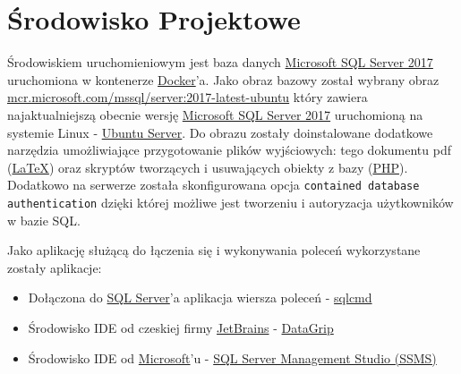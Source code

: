 \section{Środowisko Projektowe}

Środowiskiem uruchomieniowym jest baza danych \href{https://www.microsoft.com/pl-pl/sql-server/sql-server-2017}{Microsoft SQL Server 2017} uruchomiona w kontenerze \href{https://www.docker.com}{Docker}'a. Jako obraz bazowy został wybrany obraz \href{https://hub.docker.com/r/microsoft/mssql-server}{mcr.microsoft.com/mssql/server:2017-latest-ubuntu} który zawiera najaktualniejszą obecnie wersję \href{https://www.microsoft.com/pl-pl/sql-server/sql-server-2017}{Microsoft SQL Server 2017} uruchomioną na systemie Linux - \href{https://www.ubuntu.com/server}{Ubuntu Server}. Do obrazu zostały doinstalowane dodatkowe narzędzia umożliwiające przygotowanie plików wyjściowych: tego dokumentu pdf (\href{https://pl.wikipedia.org/wiki/LaTeX}{\LaTeX}) oraz skryptów tworzących i usuwających obiekty z bazy (\href{http://www.php.net}{PHP}). Dodatkowo na serwerze została skonfigurowana opcja \texttt{contained database authentication} dzięki której możliwe jest tworzeniu i autoryzacja użytkowników w bazie SQL.

Jako aplikację służącą do łączenia się i wykonywania poleceń wykorzystane zostały aplikacje: 

\begin{itemize}
\item Dołączona do \href{https://www.microsoft.com/pl-pl/sql-server/sql-server-2017}{SQL Server}'a aplikacja wiersza poleceń - \href{https://docs.microsoft.com/en-us/sql/tools/sqlcmd-utility?view=sql-server-2017}{sqlcmd}
\item Środowisko IDE od czeskiej firmy \href{https://www.jetbrains.com/}{JetBrains} - \href{https://www.jetbrains.com/datagrip/}{DataGrip}
\item Środowisko IDE od \href{https://microsoft.com/}{Microsoft}'u - \href{https://docs.microsoft.com/en-us/sql/ssms/download-sql-server-management-studio-ssms?view=sql-server-2017}{SQL Server Management Studio (SSMS)}
\end{itemize}